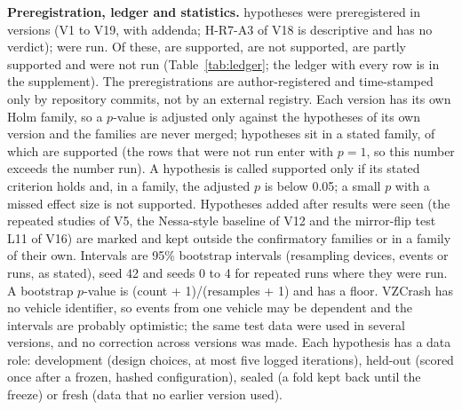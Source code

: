 \documentclass{ieeeaccess}
\begin{document}
\textbf{Preregistration, ledger and statistics.} \LedgerN{} hypotheses were preregistered in \LedgerVersions{} versions (V1 to V19, with addenda; H-R7-A3 of V18 is descriptive and has no verdict); \LedgerRun{} were run. Of these, \LedgerSupp{} are supported, \LedgerNot{} are not supported, \LedgerPartly{} are partly supported and \LedgerNotRun{} were not run (Table~\ref{tab:ledger}; the ledger with every row is in the supplement). The preregistrations are author-registered and time-stamped only by repository commits, not by an external registry. Each version has its own Holm family, so a $p$-value is adjusted only against the hypotheses of its own version and the families are never merged; \LedgerConfN{} hypotheses sit in a stated family, of which \LedgerConfSupp{} are supported (the rows that were not run enter with $p=1$, so this number exceeds the number run). A hypothesis is called supported only if its stated criterion holds and, in a family, the adjusted $p$ is below 0.05; a small $p$ with a missed effect size is not supported. Hypotheses added after results were seen (the repeated studies of V5, the Nessa-style baseline of V12 and the mirror-flip test L11 of V16) are marked and kept outside the confirmatory families or in a family of their own. Intervals are 95\% bootstrap intervals (resampling devices, events or runs, as stated), seed 42 and seeds 0 to 4 for repeated runs where they were run. A bootstrap $p$-value is (count + 1)/(resamples + 1) and has a floor. VZCrash has no vehicle identifier, so events from one vehicle may be dependent and the intervals are probably optimistic; the same test data were used in several versions, and no correction across versions was made. Each hypothesis has a data role: development (design choices, at most five logged iterations), held-out (scored once after a frozen, hashed configuration), sealed (a fold kept back until the freeze) or fresh (data that no earlier version used).
\end{document}
